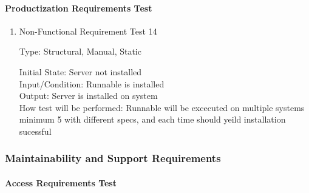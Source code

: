 \documentclass[12pt, titlepage]{article}
\begin{document}
\paragraph{Productization Requirements Test}

\begin{enumerate}


\item{Non-Functional Requirement Test 14\\}

Type: Structural, Manual, Static
					
Initial State: Server not installed \\
					
Input/Condition: Runnable is installed \\
					
Output: Server is installed on system \\
					
How test will be performed: Runnable will be excecuted on multiple systems minimum 5 with different specs,
and each time should yeild installation sucessful \\
\end{enumerate}

\subsubsection{Maintainability and Support Requirements}

\paragraph{Access Requirements Test}
\end{document}
